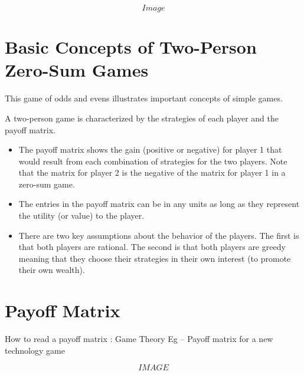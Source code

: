 \[Image\]


\section{Basic Concepts of Two-Person Zero-Sum Games}
This game of odds and evens illustrates important concepts of simple games.

A two-person game is characterized by the strategies of each player and the payoff matrix.

\begin{itemize}
\item The payoff matrix shows the gain (positive or negative) for player 1 that would result from each combination of strategies for the two players. Note that the matrix for player 2 is the negative of the matrix for player 1 in a zero-sum game.
\item The entries in the payoff matrix can be in any units as long as they represent the utility (or value) to the player.
\item There are two key assumptions about the behavior of the players. The first is that both players are rational. The second is that both players are greedy meaning that they choose their strategies in their own interest (to promote their own wealth).
\end{itemize}


\section{Payoff Matrix}

How to read a payoff matrix : Game Theory
Eg – Payoff matrix for a new technology game 

\[IMAGE\]




